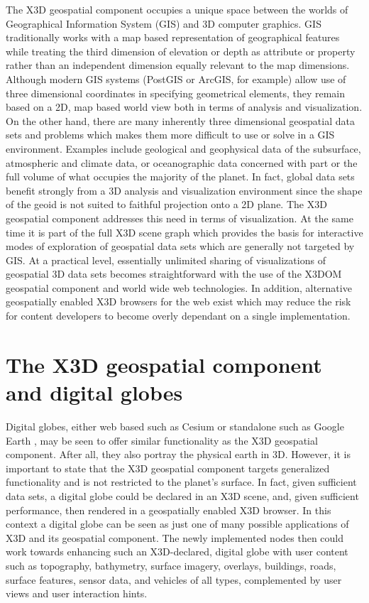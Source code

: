 \documentclass[review]{acmsiggraph}            %
\begin{document}
The X3D geospatial component occupies a unique space between the worlds of Geographical Information
System (GIS) and 3D computer graphics. GIS traditionally works with a map based representation of
geographical features while treating the third dimension of elevation or depth as attribute or
property rather than an independent dimension equally relevant to the map dimensions. Although
modern GIS systems (PostGIS or ArcGIS\texttrademark, for example) allow use of three dimensional coordinates in
specifying geometrical elements, they remain based on a 2D, map based world view both in terms of
analysis and visualization. On the other hand, there are many inherently three dimensional
geospatial data sets and problems which makes them more difficult to use or solve in a GIS
environment.  Examples include geological and geophysical data of the subsurface, atmospheric and
climate data, or oceanographic data concerned with part or the full volume of what occupies the
majority of the planet. In fact, global data sets benefit strongly from a 3D analysis and
visualization environment since the shape of the geoid is not suited to faithful projection onto a
2D plane. The X3D geospatial component addresses this need in terms of visualization. At the same
time it is part of the full X3D scene graph which provides the basis for interactive modes of
exploration of geospatial data sets which are generally not targeted by GIS. At a practical level,
essentially unlimited sharing of visualizations of geospatial 3D data sets becomes straightforward
with the use of the X3DOM geospatial component and world wide web technologies. In addition, alternative
geospatially enabled X3D browsers for the web exist \cite{bitmanagement15} which may reduce the risk for
content developers to become overly dependant on a single implementation.

\section{The X3D geospatial component and digital globes}

Digital globes, either web based such as Cesium \cite{cesium15} or standalone such as Google Earth
\cite{googleearth15}, may be seen to offer similar functionality as the X3D geospatial component.
After all, they also portray the physical earth in 3D. However, it is important to state that the
X3D geospatial component targets generalized functionality and is not restricted to the planet's
surface. In fact, given sufficient data sets, a digital globe could be declared in an X3D scene,
and, given sufficient performance, then rendered in a geospatially enabled X3D browser. In this
context a digital globe can be seen as just one of many possible applications of X3D and its
geospatial component. The newly implemented nodes then could work towards enhancing such an
X3D-declared, digital globe with user content such as topography, bathymetry, surface imagery, 
overlays, buildings, roads, surface features, sensor data, and vehicles of all types, complemented
by user views and user interaction hints.
\end{document}
